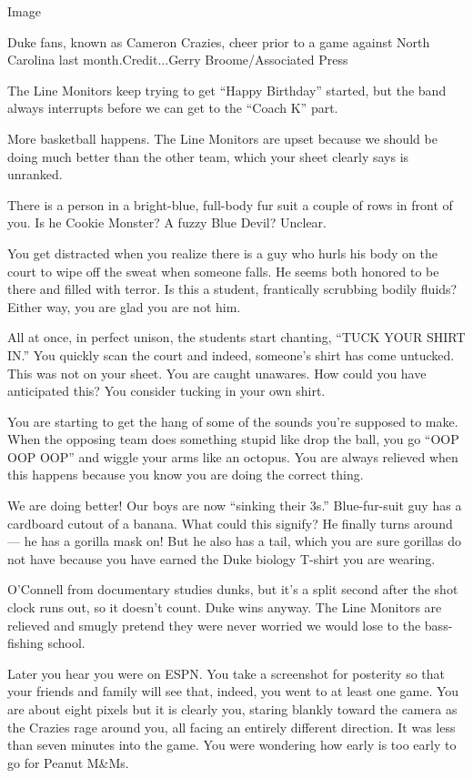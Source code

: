Image

Duke fans, known as Cameron Crazies, cheer prior to a game against North
Carolina last month.Credit...Gerry Broome/Associated Press

The Line Monitors keep trying to get ``Happy Birthday'' started, but the
band always interrupts before we can get to the ``Coach K'' part.

More basketball happens. The Line Monitors are upset because we should
be doing much better than the other team, which your sheet clearly says
is unranked.

There is a person in a bright-blue, full-body fur suit a couple of rows
in front of you. Is he Cookie Monster? A fuzzy Blue Devil? Unclear.

You get distracted when you realize there is a guy who hurls his body on
the court to wipe off the sweat when someone falls. He seems both
honored to be there and filled with terror. Is this a student,
frantically scrubbing bodily fluids? Either way, you are glad you are
not him.

All at once, in perfect unison, the students start chanting, ``TUCK YOUR
SHIRT IN.'' You quickly scan the court and indeed, someone's shirt has
come untucked. This was not on your sheet. You are caught unawares. How
could you have anticipated this? You consider tucking in your own shirt.

You are starting to get the hang of some of the sounds you're supposed
to make. When the opposing team does something stupid like drop the
ball, you go ``OOP OOP OOP'' and wiggle your arms like an octopus. You
are always relieved when this happens because you know you are doing the
correct thing.

We are doing better! Our boys are now ``sinking their 3s.''
Blue-fur-suit guy has a cardboard cutout of a banana. What could this
signify? He finally turns around --- he has a gorilla mask on! But he
also has a tail, which you are sure gorillas do not have because you
have earned the Duke biology T-shirt you are wearing.

O'Connell from documentary studies dunks, but it's a split second after
the shot clock runs out, so it doesn't count. Duke wins anyway. The Line
Monitors are relieved and smugly pretend they were never worried we
would lose to the bass-fishing school.

Later you hear you were on ESPN. You take a screenshot for posterity so
that your friends and family will see that, indeed, you went to at least
one game. You are about eight pixels but it is clearly you, staring
blankly toward the camera as the Crazies rage around you, all facing an
entirely different direction. It was less than seven minutes into the
game. You were wondering how early is too early to go for Peanut M\&Ms.

